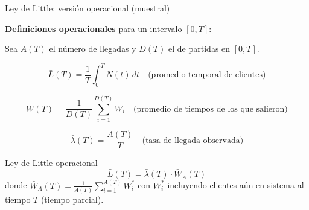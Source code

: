 \documentclass[aspectratio=1610, 9pt]{beamer}
\begin{document}
\begin{frame}{Ley de Little: versión operacional (muestral)}

\textbf{Definiciones operacionales} para un intervalo $[0, T]$:

\vspace{0.2cm}
Sea $A(T)$ el número de llegadas y $D(T)$ el de partidas en $[0,T]$.

\[
\bar{L}(T) = \frac{1}{T}\int_0^T N(t)\,dt \quad \text{(promedio temporal de clientes)}
\]

\[
\bar{W}(T) = \frac{1}{D(T)}\sum_{i=1}^{D(T)} W_i \quad \text{(promedio de tiempos de los que salieron)}
\]

\[
\bar{\lambda}(T) = \frac{A(T)}{T} \quad \text{(tasa de llegada observada)}
\]

\begin{block}{Ley de Little operacional}
\[
\bar{L}(T) = \bar{\lambda}(T) \cdot \bar{W}_A(T)
\]
donde $\bar{W}_A(T) = \frac{1}{A(T)}\sum_{i=1}^{A(T)} W_i^*$ con $W_i^*$ incluyendo clientes aún en sistema al tiempo $T$ (tiempo parcial).
\end{block}
\end{frame}
\end{document}
